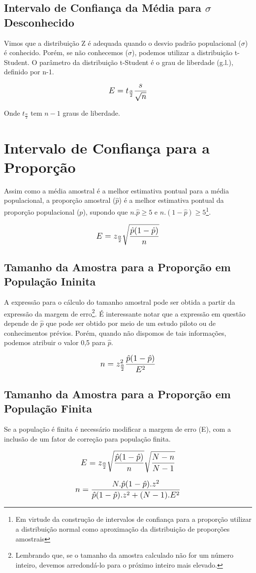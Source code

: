 \subsection{Intervalo de Confiança da Média para \(\sigma\) Desconhecido}

Vimos que a distribuição Z é adequada quando o desvio padrão populacional (\(\sigma\)) é conhecido. Porém, se não conhecemos (\(\sigma\)), podemos utilizar a distribuição t-Student. O parâmetro da distribuição t-Student é o grau de liberdade (g.l.), definido
por n-1.

\[\beq{ E = t_\frac{\alpha}{2}\frac{s}{\sqrt{n}} }\]

Onde \(t_\frac{\alpha}{2}\) tem \(n-1\) graus de liberdade.

\section{Intervalo de Confiança para a Proporção}

Assim como a média amostral é a melhor estimativa pontual para a média populacional, a proporção amostral (\(\hat{p}\)) é a melhor estimativa pontual da proporção populacional (\({p}\)), supondo que \(n.\hat{p}\geq5\) e \(n.(1-\hat{p})\geq5\)\footnote{Em virtude da construção de intervalos de confiança para a proporção utilizar a distribuição normal como aproximação da distribuição de proporções amostrais}.

\[\beq{ E = z_\frac{\alpha}{2}\sqrt{\frac{\hat{p}(1-\hat{p})}{n}} }\]

\subsection{Tamanho da Amostra para a Proporção em População Ininita}

A expressão para o cálculo do tamanho amostral pode ser obtida a partir da
expressão da margem de erro\footnote{Lembrando que, se o tamanho da amostra calculado não for um número inteiro, devemos arredondá-lo para o próximo inteiro mais elevado.}. É interessante notar que a expressão em questão depende de \(\hat{p}\) que pode ser obtido por meio de um estudo piloto ou de conhecimentos prévios. Porém, quando não dispomos de tais informações, podemos atribuir o valor 0,5 para \(\hat{p}\).

\[\beq{ n = z^2_\frac{\alpha}{2}\frac{\hat{p}(1-\hat{p})}{E^2} }\]

\subsection{Tamanho da Amostra para a Proporção em População Finita}

Se a população é finita é necessário modificar a margem de erro (E), com a inclusão de um fator de correção para população finita.

\[\beq{ E = z_\frac{\alpha}{2}\sqrt{\frac{\hat{p}(1-\hat{p})}{n}}\sqrt{\frac{N-n}{N-1}} }\]

\[\beq{ n = \frac{N.\hat{p}(1-\hat{p}).z^2}{\hat{p}(1-\hat{p}).z^2+(N-1).E^2} }\]